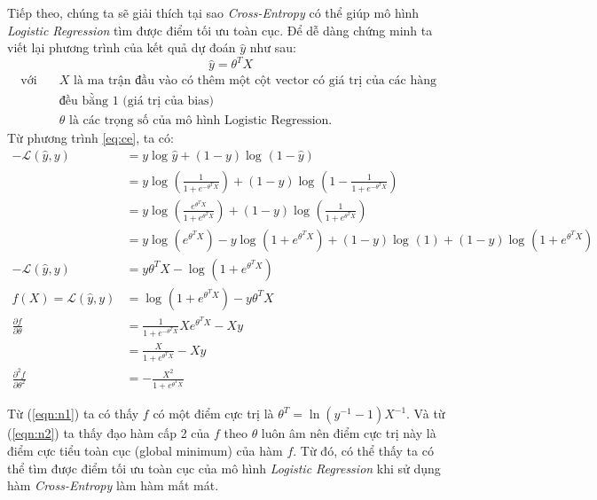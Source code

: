 Tiếp theo, chúng ta sẽ giải thích tại sao \textit{Cross-Entropy} có thể giúp mô hình \textit{Logistic Regression} tìm được điểm tối ưu toàn cục. Để dễ dàng chứng minh ta viết lại phương trình của kết quả dự đoán $\hat{y}$ như sau:
\begin{equation*}
    \hat{y} = \theta^TX
\end{equation*}
\begin{align*}
  \text{với} \quad &X \text{ là ma trận đầu vào có thêm một cột vector có giá trị của các hàng }\\
  & \text{đều bằng 1 (giá trị của bias)}\\
     &\theta \text{ là các trọng số của mô hình Logistic Regression.}
\end{align*}
Từ phương trình \eqref{eq:ce}, ta có:
\begin{align}
-\mathcal{L}(\hat{y}, y) & = y\log_{}{\hat{y}} + (1 - y)\log_{}{(1 - \hat{y})} \nonumber\\
              & = y\log_{}{(\frac{1}{1 + e^{-\theta^TX}})} + (1 - y)\log_{}{(1 - \frac{1}{1 + e^{-\theta^TX}})} \nonumber\\
              & = y\log_{}{(\frac{e^{\theta^TX}}{1 + e^{\theta^TX}})} + (1 - y)\log_{}{(\frac{1}{1 + e^{\theta^TX}})} \nonumber\\
              & = y\log_{}{(e^{\theta^TX})} - y\log_{}{(1+ e^{\theta^TX})} + (1 - y)\log_{}{(1)} + (1 - y)\log_{}{(1 + e^{\theta^TX})} \nonumber\\
-\mathcal{L}(\hat{y}, y) & = y\theta^TX - \log_{}{(1 + e^{\theta^TX})} \nonumber\\
f(X) = \mathcal{L}(\hat{y}, y) & = \log_{}{(1 + e^{\theta^TX})} - y\theta^TX \nonumber\\
\frac{\partial f}{\partial \theta} & = \frac{1}{1 + e^{-\theta^TX}}Xe^{\theta^TX} - Xy \nonumber\\
\label{eqn:n1} & = \frac{X}{1 + e^{\theta^TX}} - Xy  \\
\label{eqn:n2} \frac{\partial^2 f}{\partial \theta^2} & = -\frac{X^2}{1 + e^{\theta^TX}}
\end{align}

Từ (\ref{eqn:n1}) ta có thấy $f$ có một điểm cực trị là $\theta^T = \ln{(y^{-1} - 1)}X^{-1}$. Và từ (\ref{eqn:n2}) ta thấy đạo hàm cấp 2 của $f$ theo $\theta$ luôn âm nên điểm cực trị này là điểm cực tiểu toàn cục (global minimum) của hàm $f$. Từ đó, có thể thấy ta có thể tìm được điểm tối ưu toàn cục của mô hình \textit{Logistic Regression} khi sử dụng hàm \textit{Cross-Entropy} làm hàm mất mát.

